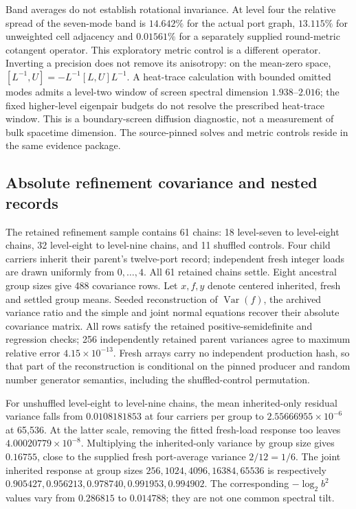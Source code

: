Band averages do not establish rotational invariance. At level four the
relative spread of the seven-mode band is \(14.642\%\) for the actual
port graph, \(13.115\%\) for unweighted cell adjacency and \(0.01561\%\)
for a separately supplied round-metric cotangent operator. This exploratory
metric control is a different operator. Inverting a precision does not
remove its anisotropy: on the mean-zero space,
\([L^{-1},U]=-L^{-1}[L,U]L^{-1}\). A heat-trace calculation with bounded
omitted modes admits a level-two window of screen spectral dimension
\(1.938\)--\(2.016\); the fixed higher-level eigenpair budgets do not
resolve the prescribed heat-trace window. This is a boundary-screen
diffusion diagnostic, not a measurement of bulk spacetime dimension.
The source-pinned solves and metric controls reside in the same evidence
package.

\subsection{Absolute refinement covariance and nested records}
\label{subsec:native-refinement-covariance}
The retained refinement sample contains 61 chains: 18 level-seven to
level-eight chains, 32 level-eight to level-nine chains, and 11 shuffled
controls. Four child carriers inherit their parent's twelve-port record;
independent fresh integer loads are drawn uniformly from \(0,\ldots,4\).
All 61 retained chains settle. Eight ancestral group sizes give 488
covariance rows. Let \(x,f,y\) denote centered inherited, fresh and
settled group means. Seeded reconstruction of \(\operatorname{Var}(f)\),
the archived variance ratio and the simple and joint normal equations
recover their absolute covariance matrix. All rows satisfy the retained
positive-semidefinite and regression checks; 256 independently retained
parent variances agree to maximum relative error \(4.15\times10^{-13}\).
Fresh arrays carry no independent production hash, so that part of
the reconstruction is conditional on the pinned producer and random
number generator semantics, including the shuffled-control permutation.

For unshuffled level-eight to level-nine chains, the mean inherited-only
residual variance falls from \(0.0108181853\) at four carriers per group
to \(2.55666955\times10^{-6}\) at 65,536. At the latter scale, removing
the fitted fresh-load response too leaves \(4.00020779\times10^{-8}\).
Multiplying the inherited-only variance by group size gives \(0.16755\),
close to the supplied fresh port-average variance \(2/12=1/6\).
The joint inherited response at group sizes
\(256,1024,4096,16384,65536\) is respectively
\(0.905427,0.956213,0.978740,0.991953,0.994902\).
The corresponding \(-\log_2 b^2\) values vary from \(0.286815\) to
\(0.014788\); they are not one common spectral tilt.

